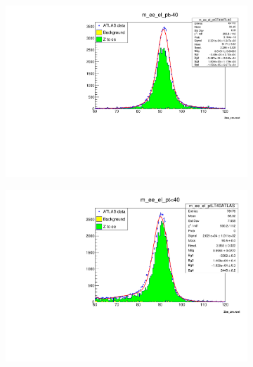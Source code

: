     \begin{figure}
        \begin{subfigure}{0.5\textwidth}
            \includegraphics[width=\textwidth]{../W_mass/Z_mass_check_el_pt-cut.pdf}
        \end{subfigure}
        \begin{subfigure}{0.5\textwidth}
            \includegraphics[width=\textwidth]{../W_mass/Z_mass_check_el_pt-cut-small.pdf}
        \end{subfigure}
        \begin{subfigure}{0.5\textwidth}

\end{subfigure}
\end{figure}
